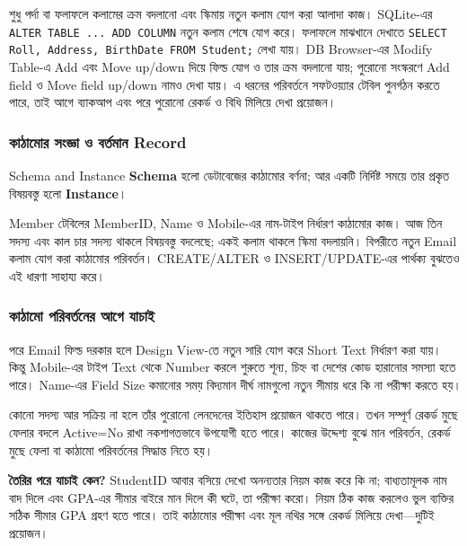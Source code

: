 শুধু পর্দা বা ফলাফলে কলামের ক্রম বদলানো এবং স্কিমায় নতুন কলাম যোগ করা আলাদা কাজ। SQLite-এর \texttt{ALTER TABLE ... ADD COLUMN} নতুন কলাম শেষে যোগ করে। ফলাফলে মাঝখানে দেখাতে \texttt{SELECT Roll, Address, BirthDate FROM Student;} লেখা যায়। DB Browser-এর Modify Table-এ Add এবং Move up/down দিয়ে ফিল্ড যোগ ও তার ক্রম বদলানো যায়; পুরোনো সংস্করণে Add field ও Move field up/down নামও দেখা যায়। এ ধরনের পরিবর্তনে সফটওয়্যার টেবিল পুনর্গঠন করতে পারে, তাই আগে ব্যাকআপ এবং পরে পুরোনো রেকর্ড ও বিধি মিলিয়ে দেখা প্রয়োজন।

\subsubsection{কাঠামোর সংজ্ঞা ও বর্তমান Record}
\begin{definitionbox}{Schema and Instance}
\textbf{Schema} হলো ডেটাবেজের কাঠামোর বর্ণনা; আর একটি নির্দিষ্ট সময়ে তার প্রকৃত বিষয়বস্তু হলো \textbf{Instance}।
\end{definitionbox}
Member টেবিলের MemberID, Name ও Mobile-এর নাম-টাইপ নির্ধারণ কাঠামোর কাজ। আজ তিন সদস্য এবং কাল চার সদস্য থাকলে বিষয়বস্তু বদলেছে; একই কলাম থাকলে স্কিমা বদলায়নি। বিপরীতে নতুন Email কলাম যোগ করা কাঠামোর পরিবর্তন। CREATE/ALTER ও INSERT/UPDATE-এর পার্থক্য বুঝতেও এই ধারণা সাহায্য করে।


\subsubsection{কাঠামো পরিবর্তনের আগে যাচাই}
পরে Email ফিল্ড দরকার হলে Design View-তে নতুন সারি যোগ করে Short Text নির্ধারণ করা যায়। কিন্তু Mobile-এর টাইপ Text থেকে Number করলে শুরুতে শূন্য, চিহ্ন বা দেশের কোড হারানোর সমস্যা হতে পারে। Name-এর Field Size কমানোর সময় বিদ্যমান দীর্ঘ নামগুলো নতুন সীমায় ধরে কি না পরীক্ষা করতে হয়।

কোনো সদস্য আর সক্রিয় না হলে তাঁর পুরোনো লেনদেনের ইতিহাস প্রয়োজন থাকতে পারে। তখন সম্পূর্ণ রেকর্ড মুছে ফেলার বদলে Active=No রাখা নকশাগতভাবে উপযোগী হতে পারে। কাজের উদ্দেশ্য বুঝে মান পরিবর্তন, রেকর্ড মুছে ফেলা বা কাঠামো পরিবর্তনের সিদ্ধান্ত নিতে হয়।



\textbf{তৈরির পরে যাচাই কেন?} StudentID আবার বসিয়ে দেখো অনন্যতার নিয়ম কাজ করে কি না; বাধ্যতামূলক নাম বাদ দিলে এবং GPA-এর সীমার বাইরে মান দিলে কী ঘটে, তা পরীক্ষা করো। নিয়ম ঠিক কাজ করলেও ভুল ব্যক্তির সঠিক সীমার GPA গ্রহণ হতে পারে। তাই কাঠামোর পরীক্ষা এবং মূল নথির সঙ্গে রেকর্ড মিলিয়ে দেখা—দুটিই প্রয়োজন।

